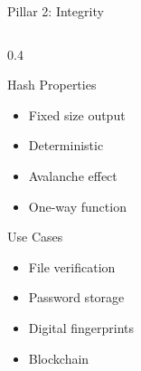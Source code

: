 \documentclass[aspectratio=169,10pt]{beamer}
\theoremstyle{plain}
\begin{document}
\begin{frame}{Pillar 2: Integrity}
\begin{columns}
       \begin{column}{0.4\textwidth}
           \begin{block}{Hash Properties}
               \begin{itemize}
                   \item Fixed size output
                   \item Deterministic
                   \item Avalanche effect
                   \item One-way function
               \end{itemize}
           \end{block}
           
           \pause
           \begin{exampleblock}{Use Cases}
               \begin{itemize}
                   \item File verification
                   \item Password storage
                   \item Digital fingerprints
                   \item Blockchain
               \end{itemize}
           \end{exampleblock}
       \end{column}
   \end{columns}
\end{frame}
\end{document}
